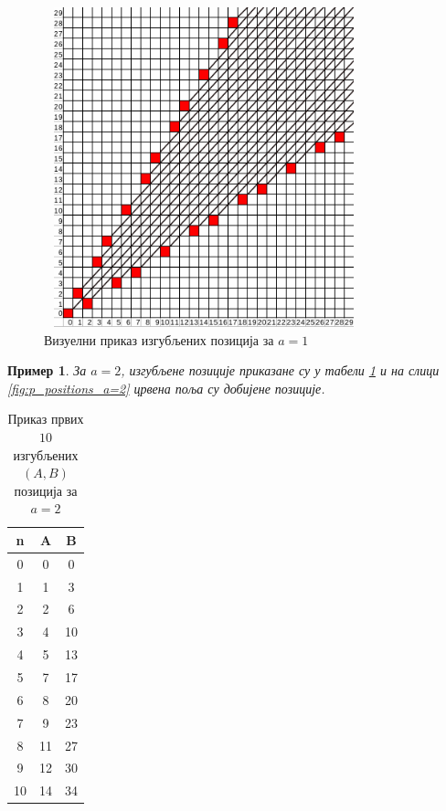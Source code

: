 \documentclass[a4paper]{article}
\newtheorem{example}{Пример}
\begin{document}
\begin{figure}[H]
	\caption{Визуелни приказ изгубљених позиција за $ a = 1 $}
	\label{fig:p_positions_a=1}
	\begin{center}
		\includegraphics[width=350px, height=350px]{p_positions_a=1.png}
	\end{center}
\end{figure}

\begin{example}
	За $ a = 2 $, изгубљене позиције приказане су у табели \ref{tab:a_2_Ppozicije} и на слици \ref{fig:p_positions_a=2} црвена поља су добијене позиције.
\end{example}

\begin{table}[h!]
	\caption{Приказ првих $ 10 $ изгубљених $ (A, B) $ позиција за $ a = 2 $}
	\label{tab:a_2_Ppozicije}
	\begin{center}
		\begin{tabular}{  c | c | c }
			{\textbf{n}} &  {\textbf{A}} &  {\textbf{B}} \\
			\hline
			0 & 0 & 0 \\
			1 & 1 & 3 \\
			2 & 2 & 6 \\
			3 & 4 & 10 \\
			4 & 5 & 13 \\
			5 & 7 & 17 \\
			6 & 8 & 20 \\
			7 & 9 & 23 \\
			8 & 11 & 27 \\
			9 & 12 & 30 \\
			10 & 14 & 34\\ 
		\end{tabular}
	\end{center}
\end{table}
\end{document}
